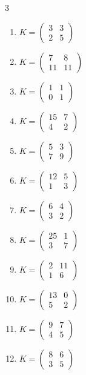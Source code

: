 \begin{multicols}{3}
\begin{enumerate}[label=\arabic*.,  leftmargin=*]
\item $K = \begin{pmatrix} 3 & 3 \\ 2 & 5 \end{pmatrix}$
\item $K = \begin{pmatrix} 7 & 8 \\ 11 & 11 \end{pmatrix}$
\item $K = \begin{pmatrix} 1 & 1 \\ 0 & 1 \end{pmatrix}$
\item $K = \begin{pmatrix} 15 & 7 \\ 4 & 2 \end{pmatrix}$
\item $K = \begin{pmatrix} 5 & 3 \\ 7 & 9 \end{pmatrix}$
\item $K = \begin{pmatrix} 12 & 5 \\ 1 & 3 \end{pmatrix}$
\item $K = \begin{pmatrix} 6 & 4 \\ 3 & 2 \end{pmatrix}$
\item $K = \begin{pmatrix} 25 & 1 \\ 3 & 7 \end{pmatrix}$
\item $K = \begin{pmatrix} 2 & 11 \\ 1 & 6 \end{pmatrix}$
\item $K = \begin{pmatrix} 13 & 0 \\ 5 & 2 \end{pmatrix}$
\item $K = \begin{pmatrix} 9 & 7 \\ 4 & 5 \end{pmatrix}$
\item $K = \begin{pmatrix} 8 & 6 \\ 3 & 5 \end{pmatrix}$

\end{enumerate}
\end{multicols}
